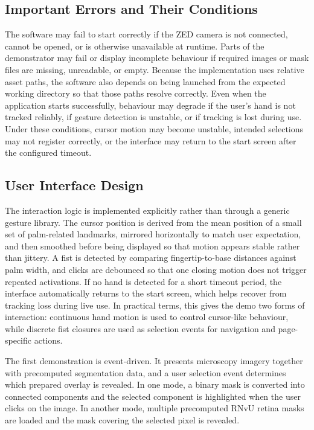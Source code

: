 ﻿\documentclass[11pt,a4paper]{article}
\begin{document}
\subsection{Important Errors and Their Conditions}

The software may
fail to start correctly if the ZED camera is not connected, cannot be opened,
or is otherwise unavailable at runtime.
Parts of
the demonstrator may fail or display incomplete behaviour if required images or
mask files are missing, unreadable, or empty. Because the implementation uses
relative asset paths, the software also depends on being launched from the
expected working directory so that those paths resolve correctly.
Even
when the application starts successfully, behaviour may degrade if the user's
hand is not tracked reliably, if gesture detection is unstable, or if tracking
is lost during use. Under these conditions, cursor motion may become unstable,
intended selections may not register correctly, or the interface may return to
the start screen after the configured timeout. 

\subsection{User Interface Design}

The interaction logic is implemented explicitly rather than through a generic
gesture library. The cursor position is derived from the mean position of a
small set of palm-related landmarks, mirrored horizontally to match user
expectation, and then smoothed before being displayed so that motion appears
stable rather than jittery. A fist is detected by comparing fingertip-to-base
distances against palm width, and clicks are debounced so that one closing
motion does not trigger repeated activations. If no hand is detected for a
short timeout period, the interface automatically returns to the start screen,
which helps recover from tracking loss during live use. In practical terms,
this gives the demo two forms of interaction: continuous hand motion is
used to control cursor-like behaviour, while discrete fist closures are used as
selection events for navigation and page-specific actions.

\medskip

The first demonstration is event-driven. It presents microscopy imagery
together with precomputed segmentation data, and a user selection event
determines which prepared overlay is revealed. In one mode, a binary mask is
converted into connected components and the selected component is highlighted
when the user clicks on the image. In another mode, multiple precomputed RNvU
retina masks are loaded and the mask covering the selected pixel is revealed.
\end{document}
